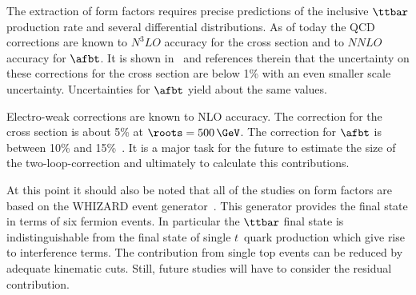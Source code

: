 The extraction of form factors requires precise predictions of the inclusive $\ttbar$ production rate and several differential distributions. 
As of today the QCD corrections are known to $N^3LO$ accuracy for the cross section and to $NNLO$ accuracy for $\afbt$. It is shown in~\cite{Amjad:2013hca} and references therein that the uncertainty on these corrections for the cross section are below 1\% with an even smaller scale uncertainty. Uncertainties for $\afbt$ yield about the same values.  

Electro-weak corrections are known to NLO accuracy. The correction for the cross section is about 5\% at $\roots=500\,\GeV$. The correction for $\afbt$ is between 10\% and 15\%~\cite{Fleischer:2003kk,Khiem:2012bp}. It is a major task for the future to estimate the size of the two-loop-correction and ultimately to calculate this contributions.

At this point it should also be noted that all of the studies on form factors are based on the WHIZARD event generator~\cite{Kilian:2007gr,Moretti:2001zz}.  This generator provides the final state in terms of six fermion events.
In particular the $\ttbar$ final state is indistinguishable from the final state of single $t$~quark production which give rise to interference terms. The contribution from single top events can be reduced by adequate kinematic cuts. Still, future studies will have to consider the residual contribution. 



